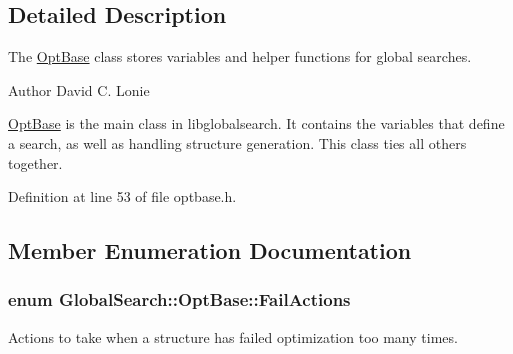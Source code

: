 \subsection{Detailed Description}
The \hyperlink{classGlobalSearch_1_1OptBase}{Opt\+Base} class stores variables and helper functions for global searches. 

\begin{DoxyAuthor}{Author}
David C. Lonie
\end{DoxyAuthor}
\hyperlink{classGlobalSearch_1_1OptBase}{Opt\+Base} is the main class in libglobalsearch. It contains the variables that define a search, as well as handling structure generation. This class ties all others together. 

Definition at line 53 of file optbase.\+h.



\subsection{Member Enumeration Documentation}
\hypertarget{classGlobalSearch_1_1OptBase_a970b328cd0a36335c34c6b24c6ac2775}{}
\subsubsection[{Fail\+Actions}]{\setlength{\rightskip}{0pt plus 5cm}enum {\bf Global\+Search\+::\+Opt\+Base\+::\+Fail\+Actions}}\label{classGlobalSearch_1_1OptBase_a970b328cd0a36335c34c6b24c6ac2775}
Actions to take when a structure has failed optimization too many times.

